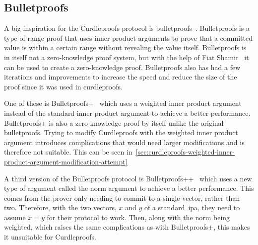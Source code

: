 \subsection{Bulletproofs}\label{subsec:related-work-bulletproofs}
A big inspiration for the Curdleproofs protocol is bulletproofs~\cite{bunz2018bulletproofs}.
Bulletproofs is a type of range proof that uses inner product arguments to prove that a committed value is within a certain range without revealing the value itself.
Bulletproofs is in itself not a zero-knowledge proof system, but with the help of Fiat Shamir~\cite{bunz2018bulletproofs} it can be used to create a zero-knowledge proof.
Bulletproofs also has had a few iterations and improvements to increase the speed and reduce the size of the proof since it was used in curdleproofs.

One of these is Bulletproofs+~\cite{chung2022bulletproofs+} which uses a weighted inner product argument instead of the standard inner product argument to achieve a better performance.
Bulletproofs+ is also a zero-knowledge proof by itself unlike the original bulletproofs.
Trying to modify Curdleproofs with the weighted inner product argument introduces complications that would need larger modifications and is therefore not suitable.
This can be seen in~\autoref{sec:curdleproofs-weighted-inner-product-argument-modification-attempt}

A third version of the Bulletproofs protocol is Bulletproofs++~\cite{eagen2024bulletproofs++} which uses a new type of argument called the norm argument to achieve a better performance.
This comes from the prover only needing to commit to a single vector, rather than two.
Therefore, with the two vectors, $x$ and $y$ of a standard~\gls{ipa}, they need to assume $x=y$ for their protocol to work.
Then, along with the norm being weighted, which raises the same complications as with Bulletproofs+, this makes it unsuitable for Curdleproofs.